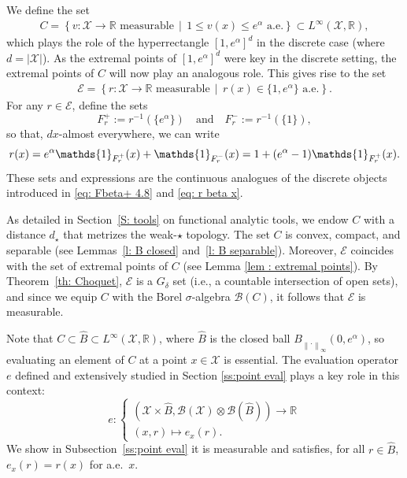 \documentclass[a4paper, 11pt]{article}
\theoremstyle{definition}
\newcommand{\norm}[1]{\left\|{#1}\right\|}
\newcommand{\theconvex}{C}
\newcommand{\indi}[1]{\mathds{1}_{#1}}
\begin{document}
{We define the set
\begin{align*}
	\theconvex = \left\{ v : \mathcal{X} \rightarrow \mathbb{R} \text{ measurable} \, \middle| \, 1 \leq v(x) \leq e^\alpha \text{ a.e.} \right\} \subset L^\infty(\mathcal{X}, \mathbb{R}),
\end{align*}
which plays the role of the hyperrectangle $[1, e^\alpha]^d$ in the discrete case (where $d = |\mathcal{X}|$). As the extremal points of $[1, e^\alpha]^d$ were key in the discrete setting, the extremal points of $\theconvex$ will now play an analogous role. This gives rise to the set
\begin{align*}
	\mathcal{E} = \left\{ r : \mathcal{X} \rightarrow \mathbb{R} \text{ measurable} \, \middle| \, r(x) \in \{1, e^\alpha\} \text{ a.e.} \right\}.
\end{align*}
For any $r \in \mathcal{E}$, define the sets
\[
F^+_r := r^{-1}(\{e^\alpha\}) \quad \text{and} \quad F^-_r := r^{-1}(\{1\}),
\]
so that, $dx$-almost everywhere, we can write
\begin{equation}{\label{eq: def r(x)}}
r(x) = e^\alpha \indi{F^+_r}(x) + \indi{F^-_r}(x) = 1 + (e^\alpha - 1)\indi{F^+_r}(x).
\end{equation}
These sets and expressions are the continuous analogues of the discrete objects introduced in \eqref{eq: Fbeta+ 4.8} and \eqref{eq: r beta x}.


As detailed in Section~\ref{S: tools} on functional analytic tools, we endow $\theconvex$ with a distance $d_\star$ that metrizes the weak-$\star$ topology. The set $\theconvex$ is convex, compact, and separable (see Lemmas~\ref{l: B closed} and~\ref{l: B separable}). Moreover, $\mathcal{E}$ coincides with the set of extremal points of $\theconvex$ (see Lemma \ref{lem : extremal points}). By Theorem~\ref{th: Choquet}, $\mathcal{E}$ is a $G_\delta$ set (i.e., a countable intersection of open sets), and since we equip $\theconvex$ with the Borel $\sigma$-algebra $\mathcal{B}(\theconvex)$, it follows that $\mathcal{E}$ is measurable. 

Note that $\theconvex \subset \widehat{B} \subset L^\infty(\mathcal{X}, \mathbb{R})$, 
where $\widehat{B}$ is the closed ball $B_{\norm{\cdot}_\infty}(0,e^\alpha)$,
so evaluating an element of $\theconvex$ at a point $x \in \mathcal{X}$ is essential. The evaluation operator $e$ defined and extensively studied in Section \ref{ss:point eval} plays a key role in this context:
\begin{equation*}
	e : 
	\begin{cases}
		(\mathcal{X} \times  \widehat{B}, \mathcal{B}(\mathcal{X}) \otimes \mathcal{B}( \widehat{B})) \to \mathbb{R} \\
		(x, r) \mapsto e_x(r).
	\end{cases}
\end{equation*}
We show in Subsection~\ref{ss:point eval} it is measurable and satisfies, for all $r \in  \widehat{B}$, $e_x(r) = r(x)$ for a.e.\ $x$. 

}
\end{document}
